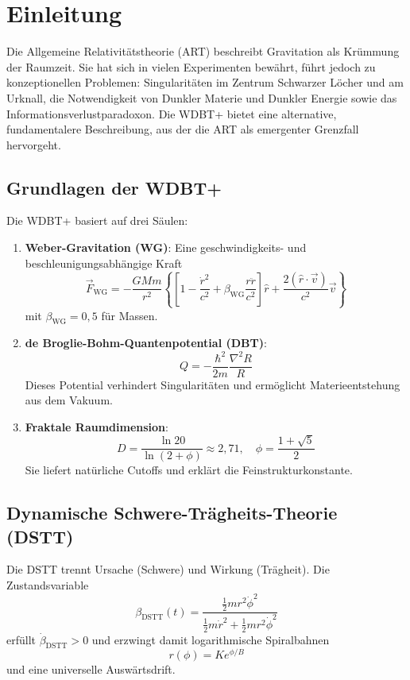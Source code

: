 \documentclass[12pt,a4paper]{article}
\begin{document}
\section{Einleitung}

Die Allgemeine Relativitätstheorie (ART) beschreibt Gravitation als Krümmung der Raumzeit. Sie hat sich in vielen Experimenten bewährt, führt jedoch zu konzeptionellen Problemen: Singularitäten im Zentrum Schwarzer Löcher und am Urknall, die Notwendigkeit von Dunkler Materie und Dunkler Energie sowie das Informationsverlustparadoxon. Die WDBT+ bietet eine alternative, fundamentalere Beschreibung, aus der die ART als emergenter Grenzfall hervorgeht.

\subsection{Grundlagen der WDBT+}

Die WDBT+ basiert auf drei Säulen:

\begin{enumerate}
\item \textbf{Weber-Gravitation (WG)}: Eine geschwindigkeits- und beschleunigungsabhängige Kraft
\[
\vec{F}_{\text{WG}} = -\frac{GMm}{r^2} \left\{ \left[ 1 - \frac{\dot{r}^2}{c^2} + \beta_{\text{WG}} \frac{r\ddot{r}}{c^2} \right] \hat{r} + \frac{2(\hat{r} \cdot \vec{v})}{c^2} \vec{v} \right\}
\]
mit $\beta_{\text{WG}}=0{,}5$ für Massen.

\item \textbf{de Broglie-Bohm-Quantenpotential (DBT)}:
\[
Q = -\frac{\hbar^2}{2m} \frac{\nabla^2 R}{R}
\]
Dieses Potential verhindert Singularitäten und ermöglicht Materieentstehung aus dem Vakuum.

\item \textbf{Fraktale Raumdimension}:
\[
D = \frac{\ln 20}{\ln(2 + \phi)} \approx 2{,}71, \quad \phi = \frac{1+\sqrt{5}}{2}
\]
Sie liefert natürliche Cutoffs und erklärt die Feinstrukturkonstante.
\end{enumerate}

\subsection{Dynamische Schwere-Trägheits-Theorie (DSTT)}

Die DSTT trennt Ursache (Schwere) und Wirkung (Trägheit). Die Zustandsvariable
\[
\beta_{\text{DSTT}}(t) = \frac{\frac{1}{2}m r^2 \dot{\phi}^2}{\frac{1}{2}m \dot{r}^2 + \frac{1}{2}m r^2 \dot{\phi}^2}
\]
erfüllt $\dot{\beta}_{\text{DSTT}} > 0$ und erzwingt damit logarithmische Spiralbahnen
\[
r(\phi) = Ke^{\phi/B}
\]
und eine universelle Auswärtsdrift.
\end{document}
